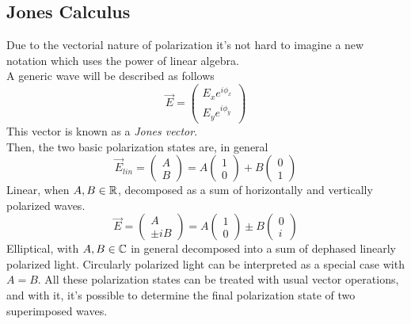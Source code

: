 \documentclass[../electromagnetism.tex]{subfiles}
\begin{document}
\subsection{Jones Calculus}
Due to the vectorial nature of polarization it's not hard to imagine a new notation which uses the power of linear algebra.\\
A generic wave will be described as follows
\begin{equation}
	\vec{E}=\begin{pmatrix}
		E_{x}e^{i\phi_x}\\
		E_ye^{i\phi_y}
	\end{pmatrix}
	\label{eq:jones.pol}
\end{equation}
This vector is known as a \textit{Jones vector}.\\
Then, the two basic polarization states are, in general
\begin{equation}
	\vec{E}_{lin}=\begin{pmatrix}
		A\\B
	\end{pmatrix}=A\begin{pmatrix}
		1\\0
	\end{pmatrix}+B\begin{pmatrix}
		0\\1
	\end{pmatrix}
	\label{eq:horizontal.jpol}
\end{equation}
Linear, when $A, B\in\operatorname{\mathbb{R}}$, decomposed as a sum of horizontally and vertically polarized waves.\\
\begin{equation}
	\vec{E}=\begin{pmatrix}
		A\\\pm iB
	\end{pmatrix}=A\begin{pmatrix}
		1\\0
	\end{pmatrix}\pm B\begin{pmatrix}
		0\\i
	\end{pmatrix}
	\label{eq:elliptical.jpol}
\end{equation}
Elliptical, with $A, B\in\operatorname{\mathbb{C}}$ in general decomposed into a sum of dephased linearly polarized light. Circularly polarized light can be interpreted as a special case with $A=B$.
All these polarization states can be treated with usual vector operations, and with it, it's possible to determine the final polarization state of two superimposed waves.\\
\end{document}

